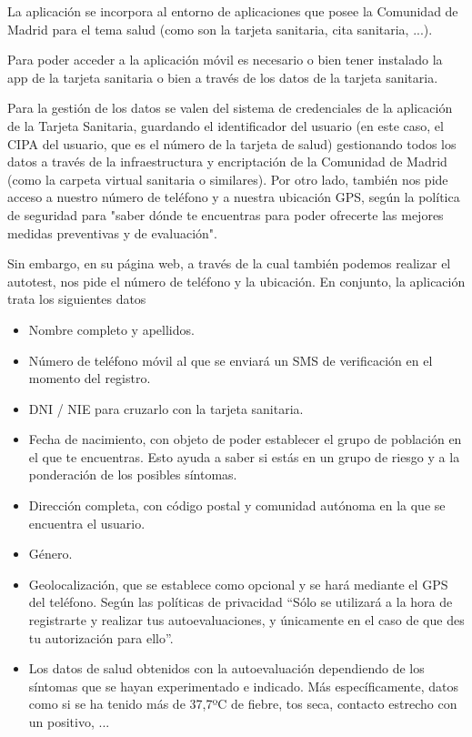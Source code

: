 \documentclass[11pt,a4paper,spanish]{article}
\begin{document}
La aplicación se incorpora al entorno de aplicaciones que posee la Comunidad de Madrid para el tema salud (como son la tarjeta sanitaria, cita sanitaria, ...).

Para poder acceder a la aplicación móvil es necesario o bien tener instalado la app de la tarjeta sanitaria o bien a través de los datos de la tarjeta sanitaria. 

Para la gestión de los datos se valen del sistema de credenciales de la aplicación de la Tarjeta Sanitaria, guardando el identificador del usuario (en este caso, el CIPA del usuario, que es el número de la tarjeta de salud) gestionando todos los datos a través de la infraestructura y encriptación de la Comunidad de Madrid (como la carpeta virtual sanitaria o similares). Por otro lado, también nos pide acceso a nuestro número de teléfono y a nuestra ubicación GPS, según la política de seguridad para "saber dónde te encuentras para poder ofrecerte las mejores medidas preventivas y de evaluación".

Sin embargo, en su página web, a través de la cual también podemos realizar el autotest, nos pide el número de teléfono y la ubicación.
En conjunto, la aplicación trata los siguientes datos 

\begin{itemize}
\item Nombre completo y apellidos.
\item Número de teléfono móvil al que se enviará un SMS de verificación en el momento del registro.
\item DNI / NIE para cruzarlo con la tarjeta sanitaria.
\item Fecha de nacimiento, con objeto de poder establecer el grupo de población en el que te encuentras. Esto ayuda a saber si estás en un grupo de riesgo y a la ponderación de los posibles síntomas.
\item Dirección completa, con código postal y comunidad autónoma en la que se encuentra el usuario.
\item Género.
\item Geolocalización, que se establece como opcional y se hará mediante el GPS del teléfono. Según las políticas de privacidad “Sólo se utilizará a la hora de registrarte y realizar tus autoevaluaciones, y únicamente en el caso de que des tu autorización para ello”.
\item Los datos de salud obtenidos con la autoevaluación dependiendo de los síntomas que se hayan experimentado e indicado. Más específicamente, datos como si se ha tenido más de 37,7ºC de fiebre, tos seca, contacto estrecho con un positivo, ...
\end{itemize}
\end{document}
